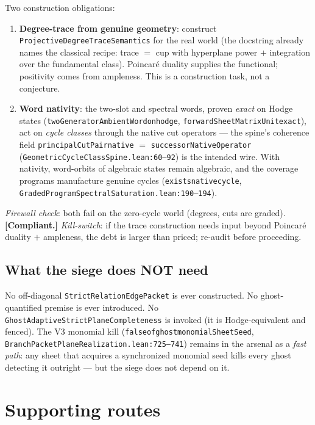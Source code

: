 \documentclass[11pt]{article}
\renewcommand{\_}{\textunderscore\allowbreak}
\newcommand{\status}[1]{\textbf{[#1]}}
\begin{document}
Two construction obligations:
\begin{enumerate}[leftmargin=2em]
\item \textbf{Degree-trace from genuine geometry}: construct
\texttt{ProjectiveDegreeTraceSemantics} for the real world (the docstring
already names the classical recipe: trace $=$ cup with hyperplane power $+$
integration over the fundamental class). Poincar\'e duality supplies the
functional; positivity comes from ampleness. This is a construction task, not
a conjecture.
\item \textbf{Word nativity}: the two-slot and spectral words, proven
\emph{exact} on Hodge states
(\texttt{twoGeneratorAmbientWord\_on\_hodge},
\texttt{forwardSheetMatrixUnit\_exact}), act on \emph{cycle classes} through
the native cut operators --- the spine's coherence field
\texttt{principalCutPair\_native} $=$ \texttt{successorNativeOperator}
(\texttt{GeometricCycleClassSpine.lean:60--92}) is the intended wire. With
nativity, word-orbits of algebraic states remain algebraic, and the coverage
programs manufacture genuine cycles
(\texttt{exists\_native\_cycle},
\texttt{GradedProgramSpectralSaturation.lean:190--194}).
\end{enumerate}

\emph{Firewall check}: both fail on the zero-cycle world (degrees, cuts are
graded). \status{Compliant.} \emph{Kill-switch}: if the trace construction
needs input beyond Poincar\'e duality $+$ ampleness, the debt is larger than
priced; re-audit before proceeding.

\subsection{What the siege does NOT need}

No off-diagonal \texttt{StrictRelationEdgePacket} is ever constructed. No
ghost-quantified premise is ever introduced. No
\texttt{GhostAdaptiveStrictPlaneCompleteness} is invoked (it is
Hodge-equivalent and fenced). The V3 monomial kill
(\texttt{false\_of\_ghost\_monomialSheetSeed},
\texttt{BranchPacketPlaneRealization.lean:725--741}) remains in the arsenal as
a \emph{fast path}: any sheet that acquires a synchronized monomial seed kills
every ghost detecting it outright --- but the siege does not depend on it.

\section{Supporting routes}\label{sec:routes}
\end{document}
